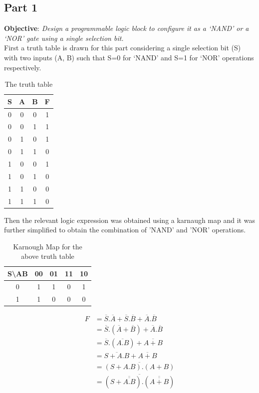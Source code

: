 \documentclass[a4paper,11pt]{article}%
\begin{document}
\subsection{Part 1}
\textbf{Objective}: \textit{Design a programmable logic block to configure it as a `NAND' or a `NOR' gate using a single selection bit.}\\

First a truth table is drawn for this part considering a single selection bit (S) with two inputs (A, B) such that S=0 for ‘NAND’ and S=1 for ‘NOR’ operations respectively.
\begin{table}[H]
	\centering
	\begin{tabular}{|c |c| c| c|}
		\hline
		S & A & B & F \\\hline
		0 & 0 & 0 & 1 \\
		0 & 0 & 1 & 1 \\
		0 & 1 & 0 & 1 \\
		0 & 1 & 1 & 0 \\\hline
		1 & 0 & 0 & 1 \\
		1 & 0 & 1 & 0 \\
		1 & 1 & 0 & 0 \\
		1 & 1 & 1 & 0 \\\hline\hline
	\end{tabular}
\caption{The truth table}
\end{table}

Then the relevant logic expression was obtained using a karnaugh map and it was further simplified to obtain the combination of 'NAND' and 'NOR' operations.

\begin{table}[H]
	\centering
	\begin{tabular}{c |c| c| c| c}
		S\textbackslash AB & 00 & 01 & 11 & 10\\\hline
		0 & 1 & 1 & 0 & 1\\\hline
		1 & 1 & 0  &0  & 0
	\end{tabular}
	\caption{Karnough Map for the above truth table}
\end{table}

\[
\begin{split}
	F &= \overline{S}.\overline{A} + \overline{S}.\overline{B} + \overline{A}.\overline{B}\\
	&= \overline{S}.(\overline{A}+\overline{B}) + \overline{A}.\overline{B}\\
	&= \overline{S}.(\overline{A.B}) + \overline{A+B}\\
	&= \overline{S+A.B} + \overline{A+B}\\
	& = \overline{(S + A.B).(A+B)}\\
	& =\overline{(S + \overline{\overline{A.B}}).(\overline{\overline{A+B}})}
\end{split}
\]
\end{document}
